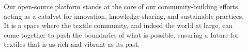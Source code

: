 \documentclass{article}
\begin{document}
    Our open-source platform stands at the core of our community-building efforts, acting as a catalyst for innovation,
    knowledge-sharing, and sustainable practices. It is a space where the textile community, and indeed the world at
    large, can come together to push the boundaries of what is possible, ensuring a future for textiles that is as
    rich and vibrant as its past.

    \newpage
    
\end{document}
